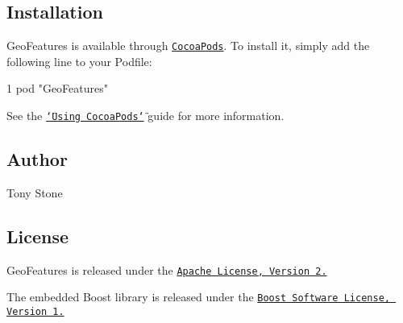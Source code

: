 \subsection*{Installation}

Geo\+Features is available through \href{http://cocoapods.org}{\tt Cocoa\+Pods}. To install it, simply add the following line to your Podfile\+:


\begin{DoxyCode}
1 pod "GeoFeatures"
\end{DoxyCode}


See the \href{https://guides.cocoapods.org/using/using-cocoapods.html}{\tt \char`\"{}\+Using Cocoa\+Pods\char`\"{}} guide for more information.

\subsection*{Author}

Tony Stone

\subsection*{License}

Geo\+Features is released under the \href{http://www.apache.org/licenses/LICENSE-2.0.html}{\tt Apache License, Version 2.}

The embedded Boost library is released under the \href{http://www.boost.org/users/license.html}{\tt Boost Software License, Version 1.} 